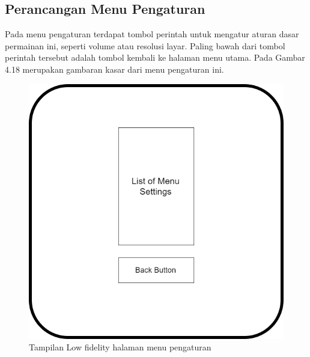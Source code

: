 	\subsection{Perancangan Menu Pengaturan}
	Pada menu pengaturan terdapat tombol perintah untuk mengatur aturan dasar permainan ini, seperti volume atau resolusi layar. Paling bawah dari tombol perintah tersebut adalah tombol kembali ke halaman menu utama. Pada Gambar 4.18 merupakan gambaran kasar dari menu pengaturan ini.
	\begin{figure}
		\centering
		\includegraphics[width=\linewidth-140pt]{pics/low/low2}
		\caption{Tampilan Low fidelity halaman menu pengaturan}
	\end{figure}
	
